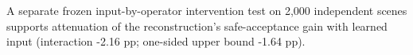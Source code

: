 A separate frozen input-by-operator intervention test on 2,000 independent scenes supports attenuation of the reconstruction's safe-acceptance gain with learned input (interaction -2.16 pp; one-sided upper bound -1.64 pp).
